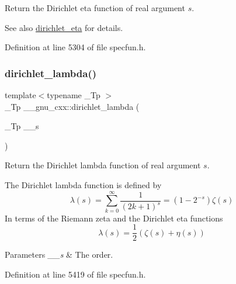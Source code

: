 Return the Dirichlet eta function of real argument $ s $.

\begin{DoxySeeAlso}{See also}
\hyperlink{group__gnu__math__spec__func_gae46e26e4107675d285c79a2d6202e6c7}{dirichlet\+\_\+eta} for details. 
\end{DoxySeeAlso}


Definition at line 5304 of file specfun.\+h.

\mbox{\label{group__gnu__math__spec__func_ga06842a81bdcabf9c62252dde992d42ee}} 
\subsubsection{\texorpdfstring{dirichlet\+\_\+lambda()}{dirichlet\_lambda()}}
{\footnotesize\ttfamily template$<$typename \+\_\+\+Tp $>$ \\
\+\_\+\+Tp \+\_\+\+\_\+gnu\+\_\+cxx\+::dirichlet\+\_\+lambda (\begin{DoxyParamCaption}\item[{\+\_\+\+Tp}]{\+\_\+\+\_\+s }\end{DoxyParamCaption})\hspace{0.3cm}{\ttfamily [inline]}}

Return the Dirichlet lambda function of real argument $ s $.

The Dirichlet lambda function is defined by \[ \lambda(s) = \sum_{k=0}^\infty \frac{1}{(2k+1)^s} = \left( 1 - 2^{-s} \right) \zeta(s) \] In terms of the Riemann zeta and the Dirichlet eta functions \[ \lambda(s) = \frac{1}{2}(\zeta(s) + \eta(s)) \]


\begin{DoxyParams}{Parameters}
{\em \+\_\+\+\_\+s} & The order. \\
\hline
\end{DoxyParams}


Definition at line 5419 of file specfun.\+h.

\mbox{\label{group__gnu__math__spec__func_gaafd3ca6b0d71d55d3835536396eece8f}} 
